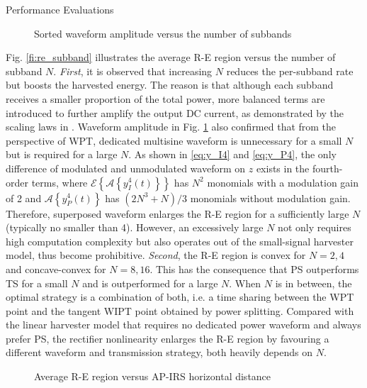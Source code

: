 \documentclass{IEEEtran}
\begin{document}
\begin{section}{Performance Evaluations}
	\begin{figure}
		\centering
		\begin{adjustbox}{width=\linewidth}
			
		\end{adjustbox}
		\caption{Sorted waveform amplitude versus the number of subbands}
		\label{fi:waveform_subband}
	\end{figure}

	Fig. \ref{fi:re_subband} illustrates the average R-E region versus the number of subband $N$. \textit{First}, it is observed that increasing $N$ reduces the per-subband rate but boosts the harvested energy. The reason is that although each subband receives a smaller proportion of the total power, more balanced terms are introduced to further amplify the output DC current, as demonstrated by the scaling laws in \cite{Clerckx2018b}. Waveform amplitude in Fig. \ref{fi:waveform_subband} also confirmed that from the perspective of WPT, dedicated multisine waveform is unnecessary for a small $N$ but is required for a large $N$. As shown in \ref{eq:y_I4} and \ref{eq:y_P4}, the only difference of modulated and unmodulated waveform on $z$ exists in the fourth-order terms, where $\mathcal{E}\left\{\mathcal{A}\left\{y_{I}^4(t)\right\}\right\}$ has $N^2$ monomials with a modulation gain of 2 and $\mathcal{A}\left\{y_{P}^4(t)\right\}$ has $(2N^3+N)/3$ monomials without modulation gain. Therefore, superposed waveform enlarges the R-E region for a sufficiently large $N$ (typically no smaller than 4). However, an excessively large $N$ not only requires high computation complexity but also operates out of the small-signal harvester model, thus become prohibitive. \textit{Second}, the R-E region is convex for $N = 2, 4$ and concave-convex for $N = 8, 16$. This has the consequence that PS outperforms TS for a small $N$ and is outperformed for a large $N$. When $N$ is in between, the optimal strategy is a combination of both, i.e. a time sharing between the WPT point and the tangent WIPT point obtained by power splitting. Compared with the linear harvester model that requires no dedicated power waveform and always prefer PS, the rectifier nonlinearity enlarges the R-E region by favouring a different waveform and transmission strategy, both heavily depends on $N$.

	\begin{figure}
		\centering
		\begin{adjustbox}{width=\linewidth}
			
		\end{adjustbox}
		\caption{Average R-E region versus AP-IRS horizontal distance}
		\label{fi:re_distance}
	\end{figure}


\end{section}
\end{document}
